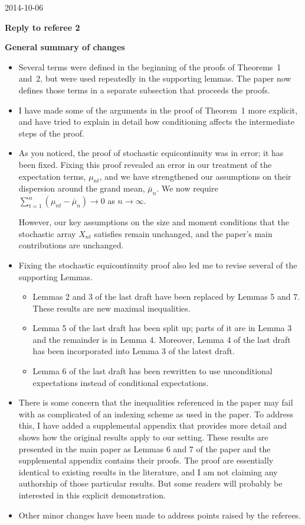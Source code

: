 \documentclass[12pt]{article}
\begin{document}
\hfill 2014-10-06

\noindent \textbf{Reply to referee 2}

\noindent \textbf{General summary of changes}

\begin{itemize}
\item Several terms were defined in the beginning of the proofs of
  Theorems~1 and~2, but were used repeatedly in the supporting
  lemmas. The paper now defines those terms in a separate subsection
  that proceeds the proofs.

\item I have made some of the arguments in the proof of Theorem~1 more
  explicit, and have tried to explain in detail how conditioning
  affects the intermediate steps of the proof.

\item As you noticed, the proof of stochastic equicontinuity
  was in error; it has been fixed. Fixing this proof revealed an error
  in our treatment of the expectation terms, $\mu_{nt}$, and we have
  strengthened our assumptions on their dispersion around the grand
  mean, $\bar \mu_n$. We now require
  $\sum_{t=1}^n (\mu_{nt} - \bar \mu_n) \to 0$
  as $n \to \infty$.

  However, our key assumptions on the size and moment conditions that
  the stochastic array $X_{nt}$ satisfies remain unchanged, and the
  paper's main contributions are unchanged.

\item Fixing the stochastic equicontinuity proof also led me to revise
  several of the supporting Lemmas.
  \begin{itemize}
  \item Lemmas 2 and 3 of the last draft have been replaced by Lemmas
    5 and 7. These results are new maximal inequalities.
  \item Lemma 5 of the last draft has been split up; parts of it are
    in Lemma 3 and the remainder is in Lemma 4. Moreover, Lemma 4 of
    the last draft has been incorporated into Lemma 3 of the latest draft.
  \item Lemma 6 of the last draft has been rewritten to use
    unconditional expectations instead of conditional expectations.
  \end{itemize}

\item There is some concern that the inequalities referenced in the
  paper may fail with as complicated of an indexing scheme as used in
  the paper. To address this, I have added a supplemental appendix
  that provides more detail and shows how the original results apply
  to our setting. These results are presented in the main paper as
  Lemmas 6 and 7 of the paper and the supplemental appendix contains
  their proofs. The proof are essentially identical to existing
  results in the literature, and I am not claiming any authorship of
  those particular results. But some readers will probably be
  interested in this explicit demonstration.

\item Other minor changes have been made to address points raised by
  the referees.
\end{itemize}
\end{document}
